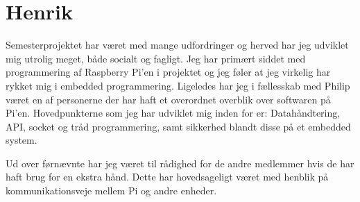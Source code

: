 \section{Henrik}

Semesterprojektet har været med mange udfordringer og herved har jeg udviklet mig utrolig meget, både socialt og fagligt.
Jeg har primært siddet med programmering af Raspberry Pi'en i projektet og jeg føler at jeg virkelig har rykket mig i embedded programmering.
Ligeledes har jeg i fællesskab med Philip været en af personerne der har haft et overordnet overblik over softwaren på Pi'en.
Hovedpunkterne som jeg har udviklet mig inden for er: Datahåndtering, API, socket og tråd programmering, samt sikkerhed blandt disse på et embedded system.

Ud over førnævnte har jeg været til rådighed for de andre medlemmer hvis de har haft brug for en ekstra hånd. Dette har hovedsageligt været med henblik på kommunikationsveje mellem Pi og andre enheder.